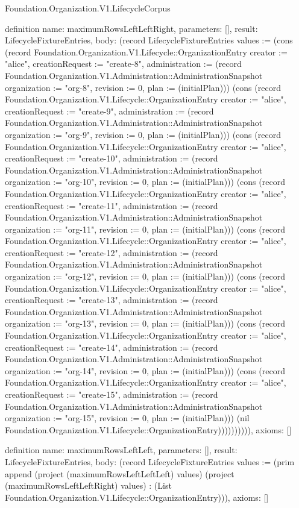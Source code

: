 \begin{lexlean}{Foundation.Organization.V1.LifecycleCorpus}
\begin{semanticmodule}
definition{
  name: maximumRowsLeftLeftRight,
  parameters: [],
  result: LifecycleFixtureEntries,
  body: (record LifecycleFixtureEntries {values := (cons (record Foundation.Organization.V1.Lifecycle::OrganizationEntry {creator := "alice", creationRequest := "create-8", administration := (record Foundation.Organization.V1.Administration::AdministrationSnapshot {organization := "org-8", revision := 0, plan := (initialPlan)})}) (cons (record Foundation.Organization.V1.Lifecycle::OrganizationEntry {creator := "alice", creationRequest := "create-9", administration := (record Foundation.Organization.V1.Administration::AdministrationSnapshot {organization := "org-9", revision := 0, plan := (initialPlan)})}) (cons (record Foundation.Organization.V1.Lifecycle::OrganizationEntry {creator := "alice", creationRequest := "create-10", administration := (record Foundation.Organization.V1.Administration::AdministrationSnapshot {organization := "org-10", revision := 0, plan := (initialPlan)})}) (cons (record Foundation.Organization.V1.Lifecycle::OrganizationEntry {creator := "alice", creationRequest := "create-11", administration := (record Foundation.Organization.V1.Administration::AdministrationSnapshot {organization := "org-11", revision := 0, plan := (initialPlan)})}) (cons (record Foundation.Organization.V1.Lifecycle::OrganizationEntry {creator := "alice", creationRequest := "create-12", administration := (record Foundation.Organization.V1.Administration::AdministrationSnapshot {organization := "org-12", revision := 0, plan := (initialPlan)})}) (cons (record Foundation.Organization.V1.Lifecycle::OrganizationEntry {creator := "alice", creationRequest := "create-13", administration := (record Foundation.Organization.V1.Administration::AdministrationSnapshot {organization := "org-13", revision := 0, plan := (initialPlan)})}) (cons (record Foundation.Organization.V1.Lifecycle::OrganizationEntry {creator := "alice", creationRequest := "create-14", administration := (record Foundation.Organization.V1.Administration::AdministrationSnapshot {organization := "org-14", revision := 0, plan := (initialPlan)})}) (cons (record Foundation.Organization.V1.Lifecycle::OrganizationEntry {creator := "alice", creationRequest := "create-15", administration := (record Foundation.Organization.V1.Administration::AdministrationSnapshot {organization := "org-15", revision := 0, plan := (initialPlan)})}) (nil Foundation.Organization.V1.Lifecycle::OrganizationEntry)))))))))}),
  axioms: []
}

definition{
  name: maximumRowsLeftLeft,
  parameters: [],
  result: LifecycleFixtureEntries,
  body: (record LifecycleFixtureEntries {values := (prim append (project (maximumRowsLeftLeftLeft) values) (project (maximumRowsLeftLeftRight) values) : (List Foundation.Organization.V1.Lifecycle::OrganizationEntry))}),
  axioms: []
}


\end{semanticmodule}
\end{lexlean}
